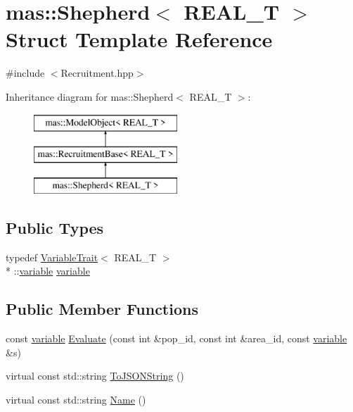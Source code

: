 \hypertarget{structmas_1_1_shepherd}{\section{mas\-:\-:Shepherd$<$ R\-E\-A\-L\-\_\-\-T $>$ Struct Template Reference}
\label{structmas_1_1_shepherd}
}


{\ttfamily \#include $<$Recruitment.\-hpp$>$}

Inheritance diagram for mas\-:\-:Shepherd$<$ R\-E\-A\-L\-\_\-\-T $>$\-:\begin{figure}[H]
\begin{center}
\leavevmode
\includegraphics[height=3.000000cm]{structmas_1_1_shepherd}
\end{center}
\end{figure}
\subsection*{Public Types}
\begin{DoxyCompactItemize}
\item 
typedef \hyperlink{structmas_1_1_variable_trait}{Variable\-Trait}$<$ R\-E\-A\-L\-\_\-\-T $>$\\*
\-::\hyperlink{structmas_1_1_shepherd_a5d9d0045570bba5f3450dcedea6a406e}{variable} \hyperlink{structmas_1_1_shepherd_a5d9d0045570bba5f3450dcedea6a406e}{variable}
\end{DoxyCompactItemize}
\subsection*{Public Member Functions}
\begin{DoxyCompactItemize}
\item 
const \hyperlink{structmas_1_1_shepherd_a5d9d0045570bba5f3450dcedea6a406e}{variable} \hyperlink{structmas_1_1_shepherd_a0e7a914d27be18b2c9efa052958d1f0b}{Evaluate} (const int \&pop\-\_\-id, const int \&area\-\_\-id, const \hyperlink{structmas_1_1_shepherd_a5d9d0045570bba5f3450dcedea6a406e}{variable} \&s)
\item 
virtual const std\-::string \hyperlink{structmas_1_1_shepherd_aafe14075a992d9157bc8594aac0a2eeb}{To\-J\-S\-O\-N\-String} ()
\item 
virtual const std\-::string \hyperlink{structmas_1_1_shepherd_aed20558dd1e310073ebba7968fe5f36f}{Name} ()
\end{DoxyCompactItemize}
